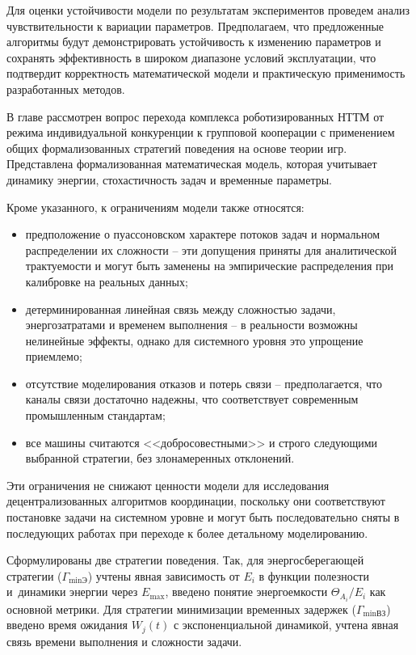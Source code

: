 
Для оценки устойчивости модели по результатам экспериментов проведем анализ чувствительности к вариации параметров. Предполагаем, что предложенные алгоритмы будут демонстрировать устойчивость к изменению параметров и сохранять эффективность в широком диапазоне условий эксплуатации, что подтвердит корректность математической модели и практическую применимость разработанных методов.

\label{sec:ch2/sec4}

В главе рассмотрен вопрос перехода комплекса роботизированных НТТМ от режима индивидуальной конкуренции к групповой кооперации с применением общих формализованных стратегий поведения на основе теории игр. Представлена формализованная математическая модель, которая учитывает динамику энергии, стохастичность задач и временные параметры.

Кроме указанного, к ограничениям модели также относятся:
\begin{itemize}[beginpenalty=10000, midpenalty=10000, wide=\parindent, leftmargin=0pt]
	\item предположение о пуассоновском характере потоков задач и нормальном распределении их сложности -- эти допущения приняты для аналитической трактуемости и могут быть заменены на эмпирические распределения при калибровке на реальных данных;
	\item детерминированная линейная связь между сложностью задачи, энергозатратами и временем выполнения -- в реальности возможны нелинейные эффекты, однако для системного уровня это упрощение приемлемо;
	\item отсутствие моделирования отказов и потерь связи -- предполагается, что каналы связи достаточно надежны, что соответствует современным промышленным стандартам;
	\item все машины считаются <<добросовестными>> и строго следующими выбранной стратегии, без злонамеренных отклонений.
\end{itemize}
Эти ограничения не снижают ценности модели для исследования децентрализованных алгоритмов координации, поскольку они соответствуют постановке задачи на системном уровне и могут быть последовательно сняты в последующих работах при переходе к более детальному моделированию.

Сформулированы две стратегии поведения. Так, для энергосберегающей стратегии ($\Gamma_{\min\text{Э}}$) учтены явная зависимость от $E_i$ в функции полезности и~динамики энергии через $E_{\text{max}}$, введено понятие энергоемкости $\Theta_{A_i}/E_i$ как основной метрики. Для стратегии минимизации временных задержек ($\Gamma_{\min\text{ВЗ}}$) введено время ожидания $W_j(t)$ с экспоненциальной динамикой, учтена явная связь времени выполнения и сложности задачи.

